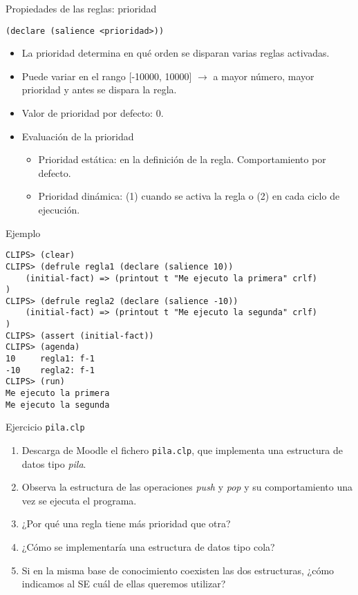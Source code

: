 \documentclass[usenames,dvipsnames,aspectratio=169]{beamer}
\begin{document}
\begin{frame}{Propiedades de las reglas: prioridad}
	\begin{center}
		\texttt{(declare (salience <prioridad>))}
	\end{center}
	\begin{itemize}
		\item La prioridad determina en qué orden se disparan varias reglas activadas.
		\item Puede variar en el rango [-10000, 10000] $\rightarrow$ a mayor número, mayor prioridad y antes se dispara la regla.
		\item Valor de prioridad por defecto: 0.
		\item Evaluación de la prioridad
		\begin{itemize}
			\item Prioridad estática: en la definición de la regla. Comportamiento por defecto.
			\item Prioridad dinámica: (1) cuando se activa la regla o (2) en cada ciclo de ejecución.
		\end{itemize}
	\end{itemize}
\end{frame}

\begin{frame}[fragile]{Ejemplo}
	\begin{verbatim}
CLIPS> (clear)
CLIPS> (defrule regla1 (declare (salience 10))
    (initial-fact) => (printout t "Me ejecuto la primera" crlf)
)
CLIPS> (defrule regla2 (declare (salience -10))
    (initial-fact) => (printout t "Me ejecuto la segunda" crlf)
)
CLIPS> (assert (initial-fact))
CLIPS> (agenda)
10     regla1: f-1
-10    regla2: f-1
CLIPS> (run)
Me ejecuto la primera
Me ejecuto la segunda
	\end{verbatim}
\end{frame}

\begin{frame}{Ejercicio \texttt{pila.clp}}
	\begin{enumerate}
		\item Descarga de Moodle el fichero \texttt{pila.clp}, que implementa una estructura de datos tipo \textit{pila}.
		\item Observa la estructura de las operaciones \textit{push} y \textit{pop} y su comportamiento una vez se ejecuta el programa.
		\item ¿Por qué una regla tiene más prioridad que otra?
		\item ¿Cómo se implementaría una estructura de datos tipo cola?
		\item Si en la misma base de conocimiento coexisten las dos estructuras, ¿cómo indicamos al SE cuál de ellas queremos utilizar?
	\end{enumerate}
\end{frame}
\end{document}
